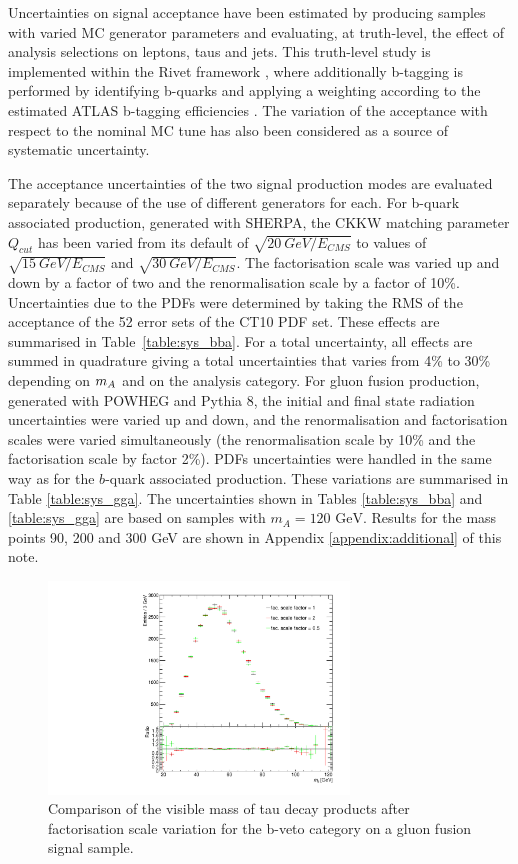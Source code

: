 Uncertainties on signal acceptance have been estimated
by producing samples with varied MC generator parameters and evaluating, at
truth-level, the effect of analysis selections on leptons, taus and
jets. This truth-level study is implemented within the Rivet framework
\cite{RIVET}, where additionally b-tagging is performed by identifying b-quarks and applying
a weighting according to the estimated ATLAS b-tagging
efficiencies \cite{BtaggingScaleFactors}. The variation of the acceptance
with respect to the nominal MC tune has also been considered as
a source of systematic uncertainty.

The acceptance uncertainties of the two signal production modes are
evaluated separately because of the use of different generators for each. For
b-quark associated production, generated with SHERPA,
the CKKW matching parameter $Q_{cut}$ has been varied from its default
of $\sqrt{20 ~ GeV/E_{CMS}}$ to values of $\sqrt{15 ~ GeV/E_{CMS}}$
and $\sqrt{30 ~ GeV/E_{CMS}}$. The factorisation scale was varied up
and down by a factor of two and the renormalisation scale by a factor of
10\%. Uncertainties due to the PDFs were determined by taking the RMS
of the acceptance of the 52 error sets of the CT10 PDF set.  These
effects are summarised in Table~\ref{table:sys_bba}. For a total
uncertainty, all effects are summed in quadrature giving a total
uncertainties that varies from 4\% to 30\% depending on $m_{A}$ and on the
analysis category.  For gluon fusion production, generated with POWHEG
and Pythia 8, the initial and final state
radiation uncertainties were varied up and down, and the
renormalisation and factorisation scales were varied simultaneously
(the renormalisation scale by 10\% and the factorisation scale by factor 2\%).
PDFs uncertainties were handled in the same way as for the $b$-quark
associated production.  These variations are summarised in Table
\ref{table:sys_gga}.  The uncertainties shown in Tables
\ref{table:sys_bba} and \ref{table:sys_gga} are based on samples with
$m_{A} = 120 \text{ GeV}$.  Results for the mass points 90, 200
and 300 GeV are shown in Appendix \ref{appendix:additional} of this note.
 

\begin{figure}[tdp]
\begin{center}
\includegraphics[width=8cm]{figure/facs_mll_bveto}
\end{center}
\caption{ Comparison of the visible mass of tau decay products after factorisation scale variation for the b-veto category on a gluon fusion signal sample.}
\label{fig:theory_mass}
\end{figure}


